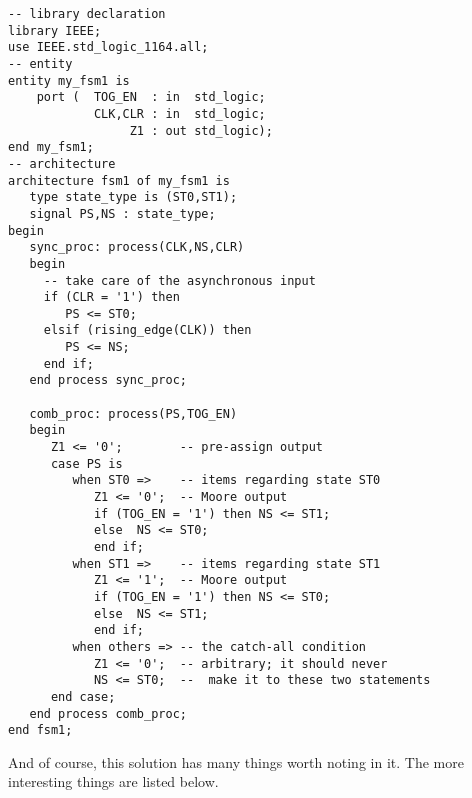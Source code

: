 \noindent
\begin{minipage}{0.99\linewidth}
\begin{lstlisting}[label=exe_18_code, caption=Solution to Example 18.]
-- library declaration
library IEEE;
use IEEE.std_logic_1164.all;
-- entity
entity my_fsm1 is 
    port (  TOG_EN  : in  std_logic; 
            CLK,CLR : in  std_logic; 
                 Z1 : out std_logic); 
end my_fsm1;
-- architecture
architecture fsm1 of my_fsm1 is
   type state_type is (ST0,ST1); 
   signal PS,NS : state_type; 
begin
   sync_proc: process(CLK,NS,CLR)
   begin
     -- take care of the asynchronous input
     if (CLR = '1') then 
        PS <= ST0;  
     elsif (rising_edge(CLK)) then 
        PS <= NS; 
     end if; 
   end process sync_proc; 

   comb_proc: process(PS,TOG_EN)
   begin
      Z1 <= '0';        -- pre-assign output
      case PS is 
         when ST0 =>    -- items regarding state ST0
            Z1 <= '0';  -- Moore output
            if (TOG_EN = '1') then NS <= ST1; 
            else  NS <= ST0; 
            end if; 
         when ST1 =>    -- items regarding state ST1
            Z1 <= '1';  -- Moore output
            if (TOG_EN = '1') then NS <= ST0; 
            else  NS <= ST1; 
            end if; 
         when others => -- the catch-all condition
            Z1 <= '0';  -- arbitrary; it should never 
            NS <= ST0;  --  make it to these two statements
      end case; 
   end process comb_proc; 
end fsm1;
\end{lstlisting}
\end{minipage}

And of course, this solution has many things worth noting in it. The more interesting things are listed below. 

